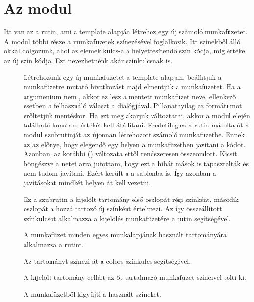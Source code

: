 \section{Az  modul}\label{sec:6.4}

Itt van az a rutin, ami a  template alapján létrehoz
egy új számoló munkafüzetet. A modul többi része a munkafüzetek
színezésével foglalkozik. Itt színekből álló okkal
dolgozunk, ahol az elemek kulcs-a a helyettesítendő szín  kódja,
míg értéke az új szín  kódja. Ezt nevezhetnénk akár színkulcsnak is.

\begin{description}
\item[] Létrehozunk egy új
  munkafüzetet a  template alapján, beállítjuk a
   munkafüzetre mutató hivatkozást majd elmentjük a 
  munkafüzetet. Ha a  argumentum nem , akkor ez
  lesz a mentett munkafüzet neve, ellenkező esetben a felhasználó
  választ a   dialógjával. 
  Pillanatnyilag az  formátumot erőltetjük mentéskor. Ha ezt
  meg akarjuk változtatni, 
  akkor a modul elején található  konstans értékét kell
  átállítani. Eredetileg ez a rutin másolta át a  modul
   szubrutinját az 
  újonnan létrehozott számoló munkafüzetbe. Ennek az az előnye, hogy
  elegendő egy helyen a  munkafüzetben javítani a
  kódot. Azonban, az  korábbi ()  változata ettől
  rendszeresen összeomlott. Kicsit böngészve a netet arra jutottam, hogy
  ezt a hibát mások is tapasztalták és nem tudom javítani. Ezért került
  a  a  sablonba is. Így azonban a
  javításokat mindkét helyen át kell vezetni. 
\item[] Ez a szubrutin a kijelölt tartomány első
  oszlopát régi színként, második oszlopát a hozzá tartozó új színként
  értelmezi. Az így összeállított színkulcsot alkalmazza a 
  kijelölés munkafüzetére a  rutin segítségével. 
\item[] A
   munkafüzet minden egyes munkalapjának használt
  tartományára alkalmazza a  rutint. 
\item[] Az
   tartományt színezi át a colors 
  színkulcs segítségével.
\item[] A kijelölt tartomány celláit az őt
  tartalmazó munkafüzet színeivel tölti ki. 
\item[] A 
  munkafüzetből kigyűjti a használt színeket.
\end{description}

